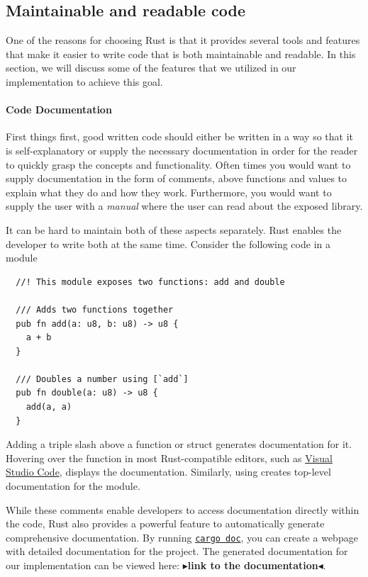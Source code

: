 \documentclass[11pt]{report}
\theoremstyle{definition}
\theoremstyle{plain}
\newcommand{\todo}[1]{{\color[rgb]{.5,0,0}\textbf{$\blacktriangleright$#1$\blacktriangleleft$}}}
\begin{document}
\subsection{Maintainable and readable code}
One of the reasons for choosing Rust is that it provides several tools and features that make it easier to write code that is both maintainable and readable. In this section, we will discuss some of the features that we utilized in our implementation to achieve this goal.

\paragraph{Code Documentation}\label{sec:code-documentation}
First things first, good written code should either be written in a way so that it is self-explanatory or supply the necessary documentation in order for the reader to quickly grasp the concepts and functionality. Often times you would want to supply documentation in the form of comments, above functions and values to explain what they do and how they work. Furthermore, you would want to supply the user with a \textit{manual} where the user can read about the exposed library.

It can be hard to maintain both of these aspects separately. Rust enables the developer to write both at the same time. Consider the following code in a module

\begin{verbatim}
  //! This module exposes two functions: add and double

  /// Adds two functions together
  pub fn add(a: u8, b: u8) -> u8 { 
    a + b
  }

  /// Doubles a number using [`add`]
  pub fn double(a: u8) -> u8 {
    add(a, a)
  }
\end{verbatim}

Adding a triple slash \rust{///} above a function or struct generates documentation for it. Hovering over the function in most Rust-compatible editors, such as \href{https://code.visualstudio.com/docs/languages/rust}{Visual Studio Code}, displays the documentation. Similarly, using \rust{//!} creates top-level documentation for the module.

While these comments enable developers to access documentation directly within the code, Rust also provides a powerful feature to automatically generate comprehensive documentation. By running \href{https://doc.rust-lang.org/cargo/commands/cargo-doc.html}{\texttt{cargo doc}}, you can create a webpage with detailed documentation for the project. The generated documentation for our implementation can be viewed here: \todo{link to the documentation}.
\end{document}

